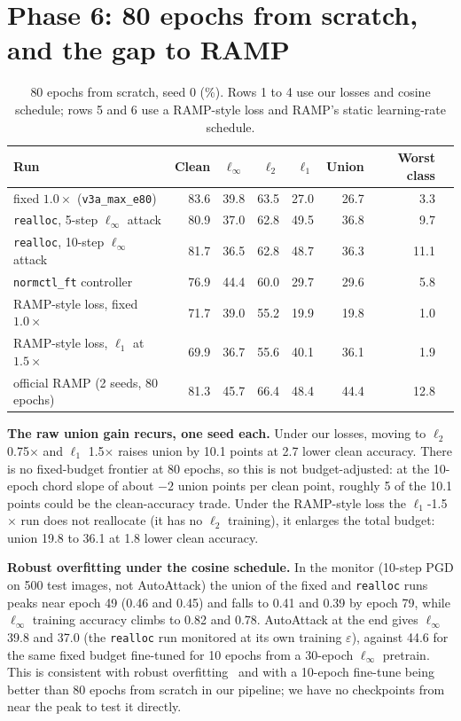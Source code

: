\documentclass[11pt]{article}
\begin{document}
\section{Phase 6: 80 epochs from scratch, and the gap to RAMP}\label{sec:e80}
\begin{table}[h]\centering\small
\caption{80 epochs from scratch, seed 0 (\%). Rows 1 to 4 use our losses and cosine schedule; rows 5 and 6 use a RAMP-style loss and RAMP's static learning-rate schedule.}\label{tab:e80}
\begin{tabular}{lrrrrrrr}\toprule
Run & Clean & $\ell_\infty$ & $\ell_2$ & $\ell_1$ & Union & Worst class\\\midrule
fixed $1.0\times$ (\texttt{v3a\_max\_e80}) & 83.6 & 39.8 & 63.5 & 27.0 & 26.7 & 3.3\\
\texttt{realloc}, 5-step $\ell_\infty$ attack & 80.9 & 37.0 & 62.8 & 49.5 & 36.8 & 9.7\\
\texttt{realloc}, 10-step $\ell_\infty$ attack & 81.7 & 36.5 & 62.8 & 48.7 & 36.3 & 11.1\\
\texttt{normctl\_ft} controller & 76.9 & 44.4 & 60.0 & 29.7 & 29.6 & 5.8\\\midrule
RAMP-style loss, fixed $1.0\times$ & 71.7 & 39.0 & 55.2 & 19.9 & 19.8 & 1.0\\
RAMP-style loss, $\ell_1$ at $1.5\times$ & 69.9 & 36.7 & 55.6 & 40.1 & 36.1 & 1.9\\\midrule
official RAMP (2 seeds, 80 epochs) & 81.3 & 45.7 & 66.4 & 48.4 & 44.4 & 12.8\\\bottomrule
\end{tabular}
\end{table}

\textbf{The raw union gain recurs, one seed each.} Under our losses, moving to $\ell_2$ 0.75$\times$ and $\ell_1$ 1.5$\times$ raises union by 10.1 points at 2.7 lower clean accuracy. There is no fixed-budget frontier at 80 epochs, so this is not budget-adjusted: at the 10-epoch chord slope of about $-2$ union points per clean point, roughly 5 of the 10.1 points could be the clean-accuracy trade. Under the RAMP-style loss the $\ell_1$-1.5$\times$ run does not reallocate (it has no $\ell_2$ training), it enlarges the total budget: union 19.8 to 36.1 at 1.8 lower clean accuracy.

\textbf{Robust overfitting under the cosine schedule.} In the monitor (10-step PGD on 500 test images, not AutoAttack) the union of the fixed and \texttt{realloc} runs peaks near epoch 49 (0.46 and 0.45) and falls to 0.41 and 0.39 by epoch 79, while $\ell_\infty$ training accuracy climbs to 0.82 and 0.78.
AutoAttack at the end gives $\ell_\infty$ 39.8 and 37.0 (the \texttt{realloc} run monitored at its own training $\varepsilon$), against 44.6 for the same fixed budget fine-tuned for 10 epochs from a 30-epoch $\ell_\infty$ pretrain. This is consistent with robust overfitting~\cite{rice} and with a 10-epoch fine-tune being better than 80 epochs from scratch in our pipeline; we have no checkpoints from near the peak to test it directly.
\end{document}

